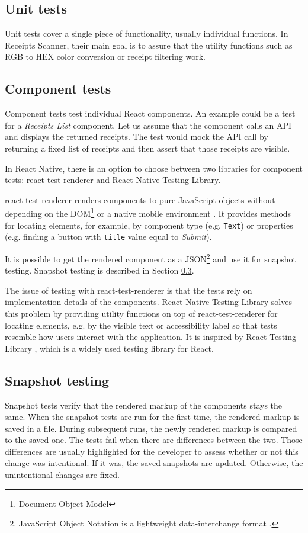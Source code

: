 \documentclass[
  digital, %
  table,   %
  oneside, %
  lof,     %
  lot,     %
]{fithesis3}
\begin{document}
\subsection{Unit tests}
Unit tests cover a single piece of functionality, usually individual functions. In Receipts Scanner, their main goal is to assure that the utility functions such as RGB to HEX color conversion or receipt filtering work.

\subsection{Component tests}
Component tests test individual React components. An example could be a test for a \textit{Receipts List} component. Let us assume that the component calls an API and displays the returned receipts. The test would mock the API call by returning a fixed list of receipts and then assert that those receipts are visible.

In React Native, there is an option to choose between two libraries for component tests: react-test-renderer and React Native Testing Library. 

react-test-renderer renders components to pure JavaScript objects without depending on the DOM\footnote{Document Object Model} or a native mobile environment \cite{ReactTestRenderer}. It provides methods for locating elements, for example, by component type (e.g. \texttt{Text}) or properties (e.g. finding a button with \texttt{title} value equal to \textit{Submit}).

It is possible to get the rendered component as a JSON\footnote{JavaScript Object Notation is a lightweight data-interchange format \cite{Ecma2017JSON}.} and use it for snapshot testing. Snapshot testing is described in Section \ref{sec:snapshot_testing}.

The issue of testing with react-test-renderer is that the tests rely on implementation details of the components. React Native Testing Library solves this problem by providing utility functions on top of react-test-renderer \cite{ReactNativeTestingLibrary} for locating elements, e.g. by the visible text or accessibility label so that tests resemble how users interact with the application. It is inspired by React Testing Library \cite{ReactNativeTestingLibrary}, which is a widely used testing library for React.

\subsection{Snapshot testing}
\label{sec:snapshot_testing}
Snapshot tests verify that the rendered markup of the components stays the same. When the snapshot tests are run for the first time, the rendered markup is saved in a file.
During subsequent runs, the newly rendered markup is compared to the saved one. The tests fail when there are differences between the two. Those differences are usually highlighted for the developer to assess whether or not this change was intentional. If it was, the saved snapshots are updated. Otherwise, the unintentional changes are fixed.
\end{document}
